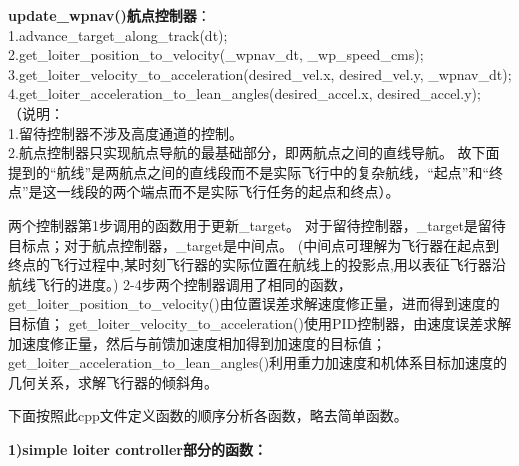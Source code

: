 \documentclass[a4paper,10pt]{ctexart} %
\begin{document}
\noindent\textbf{update\_wpnav()航点控制器}：\\
1.advance\_target\_along\_track(dt);\\
2.get\_loiter\_position\_to\_velocity(\_wpnav\_dt, \_wp\_speed\_cms);\\
3.get\_loiter\_velocity\_to\_acceleration(desired\_vel.x, desired\_vel.y, \_wpnav\_dt);\\
4.get\_loiter\_acceleration\_to\_lean\_angles(desired\_accel.x, desired\_accel.y);\\
（说明：\\
1.留待控制器不涉及高度通道的控制。\\
2.航点控制器只实现航点导航的最基础部分，即两航点之间的直线导航。
故下面提到的“航线”是两航点之间的直线段而不是实际飞行中的复杂航线，“起点”和“终点”是这一线段的两个端点而不是实际飞行任务的起点和终点）。

两个控制器第1步调用的函数用于更新\_target。
对于留待控制器，\_target是留待目标点；对于航点控制器，\_target是中间点。
(中间点可理解为飞行器在起点到终点的飞行过程中,某时刻飞行器的实际位置在航线上的投影点,用以表征飞行器沿航线飞行的进度。)
2-4步两个控制器调用了相同的函数，
get\_loiter\_position\_to\_velocity()由位置误差求解速度修正量，进而得到速度的目标值；
get\_loiter\_velocity\_to\_acceleration()使用PID控制器，由速度误差求解加速度修正量，然后与前馈加速度相加得到加速度的目标值；
get\_loiter\_acceleration\_to\_lean\_angles()利用重力加速度和机体系目标加速度的几何关系，求解飞行器的倾斜角。


下面按照此cpp文件定义函数的顺序分析各函数，略去简单函数。

\vspace{10pt}
\noindent \textbf{\large 1)simple loiter controller部分的函数：}
\end{document}
